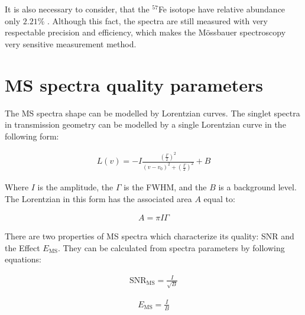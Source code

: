 \par
It is also necessary to consider, that the $^{57}$Fe isotope have relative abundance only $2.21 \%$ \cite{compounds}. Although this fact, the spectra are still measured with very respectable precision and efficiency, which makes the Mössbauer spectroscopy very sensitive measurement method.

\section{MS spectra quality parameters}
The MS spectra shape can be modelled by Lorentzian curves. The singlet spectra in transmission geometry can be modelled by a single Lorentzian curve in the following form:

\begin{equation}
\begin{aligned}
L(v) = -I\frac{(\frac{\Gamma}{2})^2}{(v - v_0)^2 + (\frac{\Gamma}{2})^2} + B
\end{aligned}
\label{lor}
\end{equation}

Where $I$ is the amplitude, the $\Gamma$ is the FWHM, and the $B$ is a background level. The Lorentzian in this form has the associated area $A$ equal to:

\begin{equation}
\begin{aligned}
A = \pi I \Gamma
\end{aligned}
\label{area}
\end{equation}

There are two properties of MS spectra which characterize its quality: SNR and the Effect $E_{\textrm{MS}}$. They can be calculated from spectra parameters by following equations:

\begin{equation}
\begin{aligned}
\textrm{SNR}_{\textrm{MS}} = \frac{I}{\sqrt{B}}
\end{aligned}
\label{SNR}
\end{equation}

\begin{equation}
\begin{aligned}
E_{\textrm{MS}} = \frac{I}{B}
\end{aligned}
\label{effect}
\end{equation}



